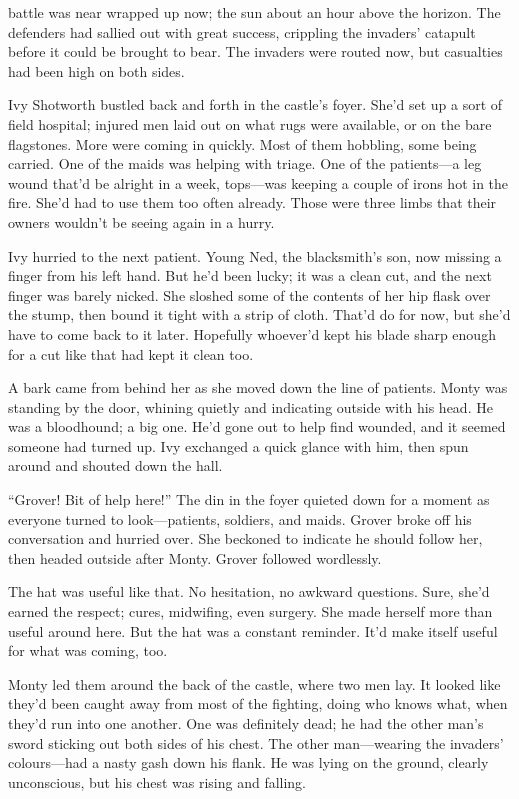 \storychapter{}

 battle was near wrapped up now; the sun about an hour above the horizon.
The defenders had sallied out with great success, crippling the invaders' catapult before it could be brought to bear.
The invaders were routed now, but casualties had been high on both sides.

Ivy Shotworth bustled back and forth in the castle's foyer.
She'd set up a sort of field hospital; injured men laid out on what rugs were available, or on the bare flagstones.
More were coming in quickly.
Most of them hobbling, some being carried.
One of the maids was helping with triage.
One of the patients---a leg wound that'd be alright in a week, tops---was keeping a couple of irons hot in the fire.
She'd had to use them too often already.
Those were three limbs that their owners wouldn't be seeing again in a hurry.

Ivy hurried to the next patient.
Young Ned, the blacksmith's son, now missing a finger from his left hand.
But he'd been lucky; it was a clean cut, and the next finger was barely nicked.
She sloshed some of the contents of her hip flask over the stump, then bound it tight with a strip of cloth.
That'd do for now, but she'd have to come back to it later.
Hopefully whoever'd kept his blade sharp enough for a cut like that had kept it clean too.

A bark came from behind her as she moved down the line of patients.
Monty was standing by the door, whining quietly and indicating outside with his head.
He was a bloodhound; a big one.
He'd gone out to help find wounded, and it seemed someone had turned up.
Ivy exchanged a quick glance with him, then spun around and shouted down the hall.

``Grover!
Bit of help here!''
The din in the foyer quieted down for a moment as everyone turned to look---patients, soldiers, and maids.
Grover broke off his conversation and hurried over.
She beckoned to indicate he should follow her, then headed outside after Monty.
Grover followed wordlessly.

The hat was useful like that.
No hesitation, no awkward questions.
Sure, she'd earned the respect; cures, midwifing, even surgery.
She made herself more than useful around here.
But the hat was a constant reminder.
It'd make itself useful for what was coming, too.

Monty led them around the back of the castle, where two men lay.
It looked like they'd been caught away from most of the fighting, doing who knows what, when they'd run into one another.
One was definitely dead; he had the other man's sword sticking out both sides of his chest.
The other man---wearing the invaders' colours---had a nasty gash down his flank.
He was lying on the ground, clearly unconscious, but his chest was rising and falling.

